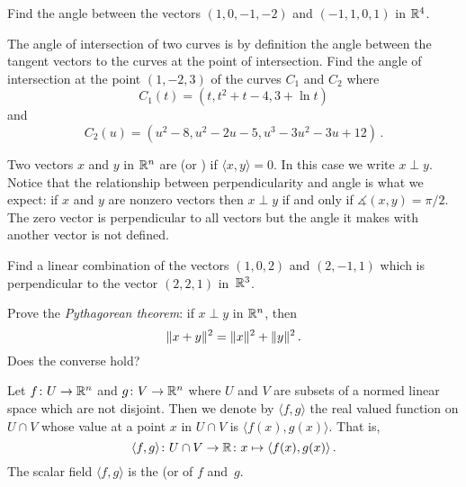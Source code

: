 \begin{prob} Find the angle between the vectors $(1,0,-1,-2)$ and $(-1,1,0,1)$ in $\mathbb{R}^4$.
\end{prob}

\begin{prob} The angle of intersection of two curves is by definition the angle between the
tangent vectors to the curves at the point of intersection.  Find the angle of
intersection at the point $(1,-2,3)$ of the curves $C_1$ and $C_2$ where
  \[ C_1(t) = (t, t^2 + t - 4, 3 + \ln t) \]
and
  \[ C_2(u) = (u^2 - 8, u^2 - 2u - 5, u^3 - 3u^2 - 3u + 12)\,. \]
\end{prob}

\begin{defn} Two vectors $x$ and $y$ in $\mathbb{R}^n$ are
 (or
) if $\langle x,y \rangle = 0$.  In this case we write
$x \perp y$.  Notice that the relationship between perpendicularity and angle is what we
expect: if $x$ and $y$ are nonzero vectors then $x \perp y$ if and only if
$\measuredangle(x,y) = \pi/2$.  The zero vector is perpendicular to all vectors but the angle
it makes with another vector is not defined.
\end{defn}

\begin{prob}  Find a linear combination of the vectors $(1,0,2)$ and $(2,-1,1)$ which is
perpendicular to the vector $(2,2,1)$ in~$\mathbb{R}^3$.
\end{prob}

\begin{prob}  Prove the
\emph{Pythagorean theorem}: if $x \perp y$ in $\mathbb{R}^n$, then
  \[ \lVert x + y\rVert^2 = \lVert x\rVert^2 + \lVert y\rVert^2\,. \]
Does the converse hold?
\end{prob}

\begin{notn}  Let $f \colon U \rightarrow \mathbb{R}^n$ and $g \colon V \rightarrow \mathbb{R}^n$ where $U$ and $V$ are subsets
of a normed linear space which are not disjoint.  Then we denote by $\langle f,g \rangle$ the
real valued function on $U \cap V$ whose value at a point $x$ in $U \cap V$ is $\langle
f(x),g(x) \rangle$.  That is,
  \[ \langle f,g \rangle \colon U \cap V \rightarrow \mathbb{R} \colon x \mapsto \langle f(x),g(x) \rangle\,. \]
The scalar field $\langle f,g \rangle$ is the
 (or
 of $f$ and~$g$.
\end{notn}

